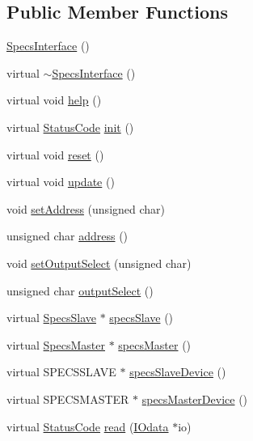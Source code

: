 \subsection*{Public Member Functions}
\begin{DoxyCompactItemize}
\item 
\hyperlink{classSpecsInterface_a33b267de6a6447965f068adea3aba138}{Specs\+Interface} ()
\item 
virtual \hyperlink{classSpecsInterface_a914c632c299fa854be1ff9387b4d8939}{$\sim$\+Specs\+Interface} ()
\item 
virtual void \hyperlink{classSpecsInterface_a24bf2b5e2da6c675ba5de3b226481a73}{help} ()
\item 
virtual \hyperlink{classStatusCode}{Status\+Code} \hyperlink{classSpecsInterface_a99ec05cbe0d15892afbec6feaf33c89b}{init} ()
\item 
virtual void \hyperlink{classSpecsInterface_ade474eeef32f10c72926c9ba7d23f9a8}{reset} ()
\item 
virtual void \hyperlink{classSpecsInterface_af17ca5c8d48bea81f84e503b2994f5da}{update} ()
\item 
void \hyperlink{classSpecsInterface_aa92dff67cc80487ee3109b6aee2fa007}{set\+Address} (unsigned char)
\item 
unsigned char \hyperlink{classSpecsInterface_a0fa039a15b842a5ba783ce825b9915d8}{address} ()
\item 
void \hyperlink{classSpecsInterface_a1907d360f2bda367cfb1d39e379c6493}{set\+Output\+Select} (unsigned char)
\item 
unsigned char \hyperlink{classSpecsInterface_ab291ed03f4c2f0143e14c26ad5f648dd}{output\+Select} ()
\item 
virtual \hyperlink{classSpecsSlave}{Specs\+Slave} $\ast$ \hyperlink{classSpecsInterface_a13cf39bddfa8ba21d6e6aa78e78f0e4f}{specs\+Slave} ()
\item 
virtual \hyperlink{classSpecsMaster}{Specs\+Master} $\ast$ \hyperlink{classSpecsInterface_a3d497c965fb6ec06b49a54b7901a22b2}{specs\+Master} ()
\item 
virtual S\+P\+E\+C\+S\+S\+L\+A\+VE $\ast$ \hyperlink{classSpecsInterface_ac8d4711197f484f055533ec1e5ae01a1}{specs\+Slave\+Device} ()
\item 
virtual S\+P\+E\+C\+S\+M\+A\+S\+T\+ER $\ast$ \hyperlink{classSpecsInterface_aa8aeaa74acf2c913905ea996d153a6ef}{specs\+Master\+Device} ()
\item 
virtual \hyperlink{classStatusCode}{Status\+Code} \hyperlink{classSpecsInterface_a6f1c8ca420f08c8fca9347ca743087c5}{read} (\hyperlink{classIOdata}{I\+Odata} $\ast$io)

\end{DoxyCompactItemize}
